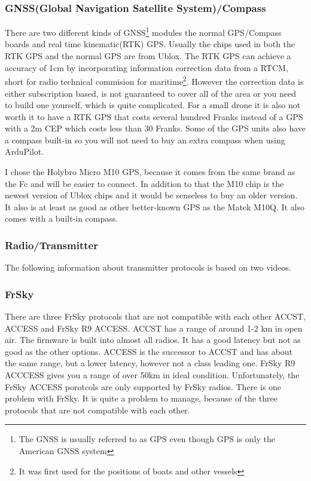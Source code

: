\documentclass{article}
\begin{document}
	\subsubsection{GNSS(Global Navigation Satellite System)/Compass}
	There are two different kinds of GNSS\footnote{The GNSS is usually referred to as GPS even though GPS is only the American GNSS system} modules the normal GPS/Compass boards and real time kinematic(RTK) GPS. Usually the chips used in both the RTK GPS and the normal GPS are from Ublox. The RTK GPS can achieve a accuracy of 1cm by incorporating information correction data from a RTCM, short for radio technical commision for maritime\footnote{It was first used for the positions of boats and other vessels}. However the correction data is either subscription based, is not guaranteed to cover all of the area or you need to build one yourself, which is quite complicated\cite{rtkgps}. For a small drone it is also not worth it to have a RTK GPS that costs several hundred Franks instead of a GPS with a 2m CEP which costs less than 30 Franks. Some of the GPS units also have a compass built-in so you will not need to buy an extra compass when using ArduPilot. 
	
	I chose the Holybro Micro M10 GPS\cite{holybrom10micro}, because it comes from the same brand as the Fc and will be easier to connect. In addition to that the M10 chip is the newest version of Ublox chips and it would be senseless to buy an older version. It also is at least as good as other better-known GPS as the Matek M10Q\cite{gpstest}. It also comes with a built-in compass.	

	\subsubsection{Radio/Transmitter}
	The following information about transmitter protocols is based on two videos\cite{transprotocols}\cite{mlrs}.
	\subsubsection*{FrSky}
	There are three FrSky protocols that are not compatible with each other ACCST, ACCESS and FrSky R9 ACCESS. ACCST has a range of around 1-2 km in open air. The firmware is built into almost all radios. It has a good latency but not as good as the other options. ACCESS is the successor to ACCST and has about the same range, but a lower latency, however not a class leading one. FrSky R9 ACCCESS gives you a range of over 50km in ideal condition. Unfortunately, the FrSky ACCESS porotcols are only supported by FrSky radios. There is one problem with FrSky. It is quite a problem to manage, because of the three protocols that are not compatible with each other.
\end{document}
